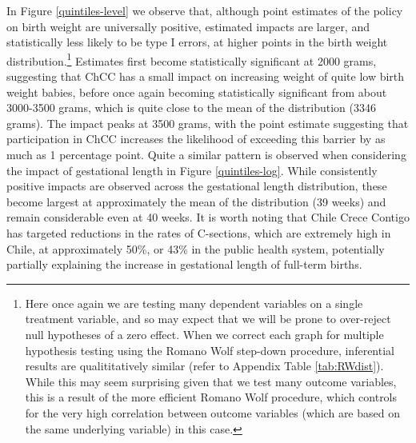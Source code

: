 \documentclass[12pt]{article}
\begin{document}
\begin{spacing}{1.4}
In Figure \ref{quintiles-level} we observe that, although point estimates
of the policy on birth weight are universally positive, estimated impacts
are larger, and statistically less likely to be type I errors, at higher
points in the birth weight distribution.\footnote{Here once again we are
  testing many dependent variables on a single treatment variable, and so
  may expect that we will be prone to over-reject null hypotheses of a
  zero effect.  When we correct each graph for multiple hypothesis
  testing using the Romano Wolf step-down procedure, inferential results
  are qualititatively similar (refer to Appendix Table \ref{tab:RWdist}).
  While this may seem surprising given that we test many outcome variables,
  this is a result of the more efficient Romano Wolf procedure, which
  controls for the very high correlation between outcome variables (which
  are based on the same underlying variable) in this case.}  Estimates
first become statistically
significant at 2000 grams, suggesting that ChCC has a small impact on
increasing weight of quite low birth weight babies, before once again
becoming statistically significant from about 3000-3500 grams, which is
quite close to the mean of the distribution (3346 grams).  The impact
peaks at 3500 grams, with the point estimate suggesting that participation
in ChCC increases the likelihood of exceeding this barrier by as much as
1 percentage point.  Quite a similar pattern is observed when considering
the impact of gestational length in Figure \ref{quintiles-log}. While
consistently positive impacts are observed across the gestational length
distribution, these become largest at approximately the mean of the
distribution (39 weeks) and remain considerable even at 40 weeks.  It is
worth noting that Chile Crece Contigo has targeted reductions in the
rates of C-sections, which are extremely high in Chile, at approximately
50\%, or 43\% in the public health system, potentially partially
explaining the increase in gestational length of full-term births. 


\end{spacing}
\end{document}
